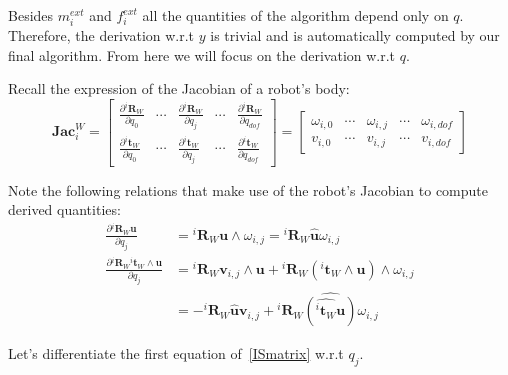 Besides $m_i^{ext}$ and $f_i^{ext}$ all the quantities of the algorithm depend only on $q$.
Therefore, the derivation w.r.t $y$ is trivial and is automatically computed by our final algorithm.
From here we will focus on the derivation w.r.t $q$.

Recall the expression of the Jacobian of a robot's body:
\begin{equation}
  \mathbf{Jac}^W_i =
  \begin{bmatrix}
    \frac{\partial {}^i\mathbf{R}_W}{\partial q_0} & \cdots &
    \frac{\partial {}^i\mathbf{R}_W}{\partial q_j} & \cdots &
    \frac{\partial {}^i\mathbf{R}_W}{\partial q_{dof}} \\
    \frac{\partial {}^i\mathbf{t}_W}{\partial q_0} & \cdots &
    \frac{\partial {}^i\mathbf{t}_W}{\partial q_j} & \cdots &
    \frac{\partial {}^i\mathbf{t}_W}{\partial q_{dof}}
  \end{bmatrix}
=
  \begin{bmatrix}
    \omega_{i,0} & \cdots &
    \omega_{i,j} & \cdots &
    \omega_{i,dof} \\
    v_{i,0} & \cdots &
    v_{i,j} & \cdots &
    v_{i,dof}
  \end{bmatrix}
\end{equation}

Note the following relations that make use of the robot's Jacobian to compute derived quantities:
\begin{align}
  \frac{\partial {}^i\mathbf{R}_W \mathbf{u}}{\partial q_j}
  &= {}^i\mathbf{R}_W \mathbf{u} \wedge \omega_{i,j}
  = {}^i\mathbf{R}_W \widehat{\mathbf{u}} \omega_{i,j}
  \\
  \frac{\partial {}^i\mathbf{R}_W {}^i\mathbf{t}_W\wedge \mathbf{u}}{\partial q_j}
  &= {}^i\mathbf{R}_W \mathbf{v}_{i,j} \wedge \mathbf{u}
  + {}^i\mathbf{R}_W \left({}^i\mathbf{t}_W\wedge\mathbf{u}\right) \wedge \omega_{i,j}\\
  &= -{}^i\mathbf{R}_W \widehat{\mathbf{u}} \mathbf{v}_{i,j}
  + {}^i\mathbf{R}_W \widehat{\left(\widehat{{}^i\mathbf{t}_W}\mathbf{u}\right)} \omega_{i,j}
\end{align}

Let's differentiate the first equation of~\ref{ISmatrix} w.r.t $q_j$.

